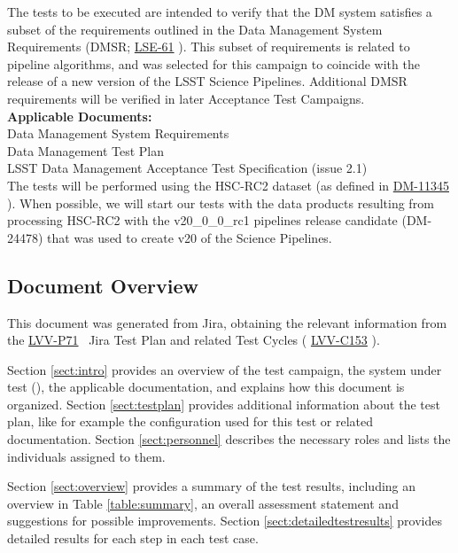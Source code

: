 \documentclass[DM,lsstdraft,STR,toc]{lsstdoc}
\begin{document}
 The tests to be executed are intended to verify that the DM system
satisfies a subset of the requirements outlined in the Data Management
System Requirements (DMSR; \href{https://lse-61.lsst.io/}{LSE-61} ).
This subset of requirements is related to pipeline algorithms, and was
selected for this campaign to coincide with the release of a new version
of the LSST Science Pipelines. Additional DMSR requirements will be
verified in later Acceptance Test
Campaigns.\\[2\baselineskip]\textbf{Applicable
Documents:}\\[2\baselineskip] Data Management System
Requirements\\
 Data Management Test Plan\\
 LSST Data Management Acceptance Test Specification (issue
2.1)\\[2\baselineskip]The tests will be performed using the HSC-RC2
dataset (as defined in
\href{https://jira.lsstcorp.org/browse/DM-11345}{DM-11345} ). When
possible, we will start our tests with the data products resulting from
processing HSC-RC2 with the v20\_0\_0\_rc1 pipelines release candidate
(DM-24478) that was used to create v20 of the Science Pipelines.


\subsection{Document Overview}
\label{sect:docoverview}

This document was generated from Jira, obtaining the relevant information from the
\href{https://jira.lsstcorp.org/secure/Tests.jspa\#/testPlan/LVV-P71}{LVV-P71}
~Jira Test Plan and related Test Cycles (
\href{https://jira.lsstcorp.org/secure/Tests.jspa\#/testCycle/LVV-C153}{LVV-C153}
).

Section \ref{sect:intro} provides an overview of the test campaign, the system under test (\product{}),
the applicable documentation, and explains how this document is organized.
Section \ref{sect:testplan} provides additional information about the test plan, like for example the configuration
used for this test or related documentation.
Section \ref{sect:personnel} describes the necessary roles and lists the individuals assigned to them.

Section \ref{sect:overview} provides a summary of the test results, including an overview in Table \ref{table:summary},
an overall assessment statement and suggestions for possible improvements.
Section \ref{sect:detailedtestresults} provides detailed results for each step in each test case.
\end{document}
